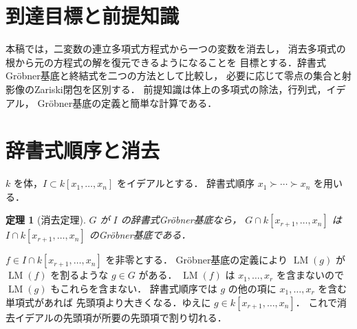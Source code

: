 \documentclass[a5paper,10pt,onecolumn]{jsarticle}
\makeatletter
\theoremstyle{mathnotetheorem}
\newtheorem{theorem}{定理}[section]
\renewcommand{\proofname}{証明}
\renewenvironment{proof}[1][\proofname]{%
  \par\pushQED{\qed}\normalfont\topsep4\p@\@plus2\p@\relax
  \trivlist\item[\hskip\labelsep\bfseries #1]\ignorespaces
}{\popQED\endtrivlist\@endpefalse}
\makeatother
\begin{document}
\section*{到達目標と前提知識}
本稿では，二変数の連立多項式方程式から一つの変数を消去し，
消去多項式の根から元の方程式の解を復元できるようになることを
目標とする．辞書式Gr\"obner基底と終結式を二つの方法として比較し，
必要に応じて零点の集合と射影像のZariski閉包を区別する．
前提知識は体上の多項式の除法，行列式，イデアル，
Gr\"obner基底の定義と簡単な計算である．

\section{辞書式順序と消去}
$k$ を体，$I\subset k[x_1,\ldots,x_n]$ をイデアルとする．
辞書式順序 $x_1\succ\cdots\succ x_n$ を用いる．
\begin{theorem}[消去定理]
$G$ が $I$ の辞書式Gr\"obner基底なら，
$G\cap k[x_{r+1},\ldots,x_n]$ は
$I\cap k[x_{r+1},\ldots,x_n]$ のGr\"obner基底である．
\end{theorem}
\begin{proof}
$f\in I\cap k[x_{r+1},\ldots,x_n]$ を非零とする．
Gr\"obner基底の定義により $\operatorname{LM}(g)$ が
$\operatorname{LM}(f)$ を割るような $g\in G$ がある．
$\operatorname{LM}(f)$ は $x_1,\ldots,x_r$ を含まないので
$\operatorname{LM}(g)$ もこれらを含まない．
辞書式順序では $g$ の他の項に $x_1,\ldots,x_r$ を含む単項式があれば
先頭項より大きくなる．ゆえに $g\in k[x_{r+1},\ldots,x_n]$．
これで消去イデアルの先頭項が所要の先頭項で割り切れる．
\end{proof}
\end{document}
